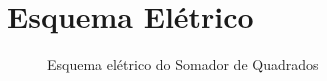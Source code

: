 \section{Esquema Elétrico}
\vspace*{\fill}
\begin{figure}[H]
    \centerline{\fontsize{20}{10}\selectfont}
    \caption{Esquema elétrico do Somador de Quadrados}
\end{figure}
\vspace*{\fill}%